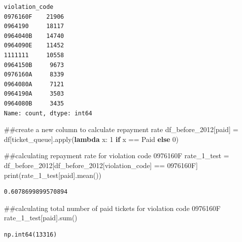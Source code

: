 \documentclass[
]{article}
\newenvironment{Shaded}{\begin{snugshade}}{\end{snugshade}}
\newcommand{\BuiltInTok}[1]{\textcolor[rgb]{0.00,0.23,0.31}{#1}}
\newcommand{\CommentTok}[1]{\textcolor[rgb]{0.37,0.37,0.37}{#1}}
\newcommand{\ControlFlowTok}[1]{\textcolor[rgb]{0.00,0.23,0.31}{\textbf{#1}}}
\newcommand{\DecValTok}[1]{\textcolor[rgb]{0.68,0.00,0.00}{#1}}
\newcommand{\KeywordTok}[1]{\textcolor[rgb]{0.00,0.23,0.31}{\textbf{#1}}}
\newcommand{\NormalTok}[1]{\textcolor[rgb]{0.00,0.23,0.31}{#1}}
\newcommand{\OperatorTok}[1]{\textcolor[rgb]{0.37,0.37,0.37}{#1}}
\newcommand{\StringTok}[1]{\textcolor[rgb]{0.13,0.47,0.30}{#1}}
\begin{document}
\begin{verbatim}
violation_code
0976160F    21906
0964190     18117
0964040B    14740
0964090E    11452
1111111     10558
0964150B     9673
0976160A     8339
0964080A     7121
0964190A     3503
0964080B     3435
Name: count, dtype: int64
\end{verbatim}

\begin{Shaded}
\begin{Highlighting}[]
\CommentTok{\#\#create a new column to calculate repayment rate}
\NormalTok{df\_before\_2012[}\StringTok{\textquotesingle{}paid\textquotesingle{}}\NormalTok{] }\OperatorTok{=}\NormalTok{ df[}\StringTok{\textquotesingle{}ticket\_queue\textquotesingle{}}\NormalTok{].}\BuiltInTok{apply}\NormalTok{(}\KeywordTok{lambda}\NormalTok{ x: }\DecValTok{1} \ControlFlowTok{if}\NormalTok{ x }\OperatorTok{==} \StringTok{\textquotesingle{}Paid\textquotesingle{}} \ControlFlowTok{else} \DecValTok{0}\NormalTok{)}
\end{Highlighting}
\end{Shaded}

\begin{Shaded}
\begin{Highlighting}[]
\CommentTok{\#\#calculating repayment rate for violation code 0976160F}
\NormalTok{rate\_1\_test }\OperatorTok{=}\NormalTok{ df\_before\_2012[df\_before\_2012[}\StringTok{\textquotesingle{}violation\_code\textquotesingle{}}\NormalTok{] }\OperatorTok{==} \StringTok{\textquotesingle{}0976160F\textquotesingle{}}\NormalTok{]}
\BuiltInTok{print}\NormalTok{(rate\_1\_test[}\StringTok{\textquotesingle{}paid\textquotesingle{}}\NormalTok{].mean())}
\end{Highlighting}
\end{Shaded}

\begin{verbatim}
0.6078699899570894
\end{verbatim}

\begin{Shaded}
\begin{Highlighting}[]
\CommentTok{\#\#calculating total number of paid tickets for violation code 0976160F}
\NormalTok{rate\_1\_test[}\StringTok{\textquotesingle{}paid\textquotesingle{}}\NormalTok{].}\BuiltInTok{sum}\NormalTok{()}
\end{Highlighting}
\end{Shaded}

\begin{verbatim}
np.int64(13316)
\end{verbatim}
\end{document}
